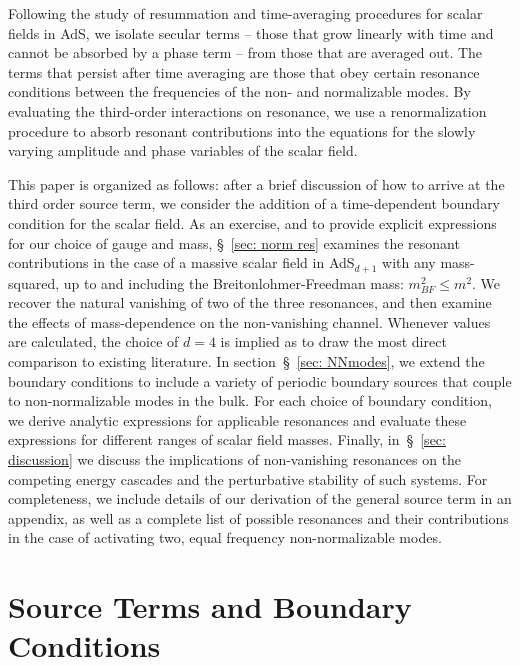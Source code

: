 \documentclass[letterpaper,11pt]{article}
\begin{document}
Following the study of resummation and time-averaging procedures for scalar fields in AdS, we isolate secular terms -- those that grow linearly with time and cannot be absorbed by a phase term -- from those that are averaged out. The terms that persist after time averaging are those that obey certain resonance conditions between the frequencies of the non- and normalizable modes. By evaluating the third-order interactions on resonance, we use a renormalization procedure to absorb resonant contributions into the equations for the slowly varying amplitude and phase variables of the scalar field.

This paper is organized as follows: after a brief discussion of how to arrive at the third order source term, we consider the addition of a time-dependent boundary condition for the scalar field. As an exercise, and to provide explicit expressions for our choice of gauge and mass, \S\!~\ref{sec: norm res} examines the resonant contributions in the case of a massive scalar field in AdS$_{d+1}$ with any mass-squared, up to and including the Breitonlohmer-Freedman mass: $m^2_{BF} \leq m^2$. We recover the natural vanishing of two of the three resonances, and then examine the effects of mass-dependence on the non-vanishing channel. Whenever values are calculated, the choice of $d=4$ is implied as to draw the most direct comparison to existing literature. In section~\S\!~\ref{sec: NNmodes}, we extend the boundary conditions to include a variety of periodic boundary sources that couple to non-normalizable modes in the bulk. For each choice of boundary condition, we derive analytic expressions for applicable resonances and evaluate these expressions for different ranges of scalar field masses. Finally, in~\S\!~\ref{sec: discussion} we discuss the implications of non-vanishing resonances on the competing energy cascades and the perturbative stability of such systems. For completeness, we include details of our derivation of the general source term in an appendix, as well as a complete list of possible resonances and their contributions in the case of activating two, equal frequency non-normalizable modes.




\section{Source Terms and Boundary Conditions}
\end{document}
